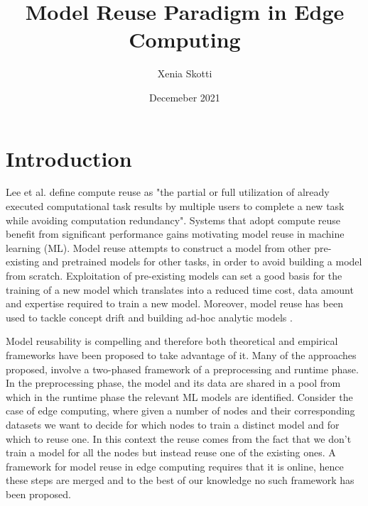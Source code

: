 \documentclass{mprop}
\begin{document}
\title{Model Reuse Paradigm in Edge Computing}
\author{Xenia Skotti}
\date{Decemeber 2021}
\maketitle

\tableofcontents
\newpage

\section{Introduction}\label{intro}

Lee et al. \cite{ComputeReuse} define compute reuse as "the partial or full utilization of already executed computational task results by multiple users to complete a new task while avoiding computation redundancy".  Systems that adopt compute reuse benefit from significant performance gains motivating model reuse in machine learning (ML). Model reuse \cite{Learnware} attempts to construct a model from other pre-existing and pretrained models for other tasks, in order to avoid building a model from scratch. Exploitation of pre-existing models can set a good basis for the training of a new model which translates into a reduced time cost, data amount and expertise required to train a new model. Moreover, model reuse has been used to tackle concept drift \cite{ConceptDrift} and building ad-hoc analytic models \cite{MaterializationReuse}.

Model reusability is compelling and therefore both theoretical \cite{Learnware} and empirical \cite{MaterializationReuse}\cite{KernelMMD}  frameworks have been proposed to take advantage of it. Many of the approaches proposed, involve a two-phased framework of a preprocessing and runtime phase. In the preprocessing phase, the model and its data are shared in a pool from which in the runtime phase the relevant ML models are identified. Consider the case of edge computing, where given a number of nodes and their corresponding datasets we want to decide for which nodes to train a distinct model and for which to reuse one. In this context the reuse comes from the fact that we don’t train a model for all the nodes but instead reuse one of the existing ones. A framework for model reuse in edge computing requires that it is online, hence these steps are merged and to the best of our knowledge no such framework has been proposed. 
\end{document}
